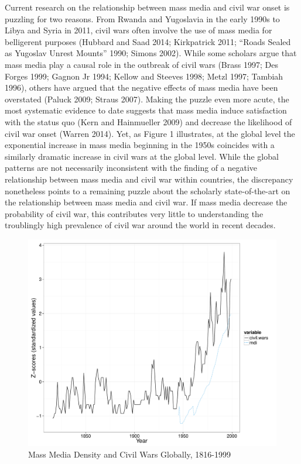 \documentclass[11pt,article,oneside]{memoir}
\makeatletter
\def\maxwidth{\ifdim\Gin@nat@width>\linewidth\linewidth
\else\Gin@nat@width\fi}
\let\Oldincludegraphics\includegraphics
\renewcommand{\includegraphics}[1]{\Oldincludegraphics[width=\maxwidth]{#1}}
\makeatother
\begin{document}
\clearpage
{}

\onehalfspacing

Current research on the relationship between mass media and civil war
onset is puzzling for two reasons. From Rwanda and Yugoslavia in the
early 1990s to Libya and Syria in 2011, civil wars often involve the use
of mass media for belligerent purposes (Hubbard and Saad 2014;
Kirkpatrick 2011; ``Roads Sealed as Yugoslav Unrest Mounts'' 1990;
Simons 2002). While some scholars argue that mass media play a causal
role in the outbreak of civil wars (Brass 1997; Des Forges 1999; Gagnon
Jr 1994; Kellow and Steeves 1998; Metzl 1997; Tambiah 1996), others have
argued that the negative effects of mass media have been overstated
(Paluck 2009; Straus 2007). Making the puzzle even more acute, the most
systematic evidence to date suggests that mass media induce satisfaction
with the status quo (Kern and Hainmueller 2009) and decrease the
likelihood of civil war onset (Warren 2014). Yet, as Figure 1
illustrates, at the global level the exponential increase in mass media
beginning in the 1950s coincides with a similarly dramatic increase in
civil wars at the global level. While the global patterns are not
necessarily inconsistent with the finding of a negative relationship
between mass media and civil war within countries, the discrepancy
nonetheless points to a remaining puzzle about the scholarly
state-of-the-art on the relationship between mass media and civil war.
If mass media decrease the probability of civil war, this contributes
very little to understanding the troublingly high prevalence of civil
war around the world in recent decades.

\begin{figure}[htbp]
\centering
\includegraphics{./media_civil_war_files/figure-markdown/globalplot.pdf}
\caption{Mass Media Density and Civil Wars Globally, 1816-1999}
\end{figure}
\end{document}
